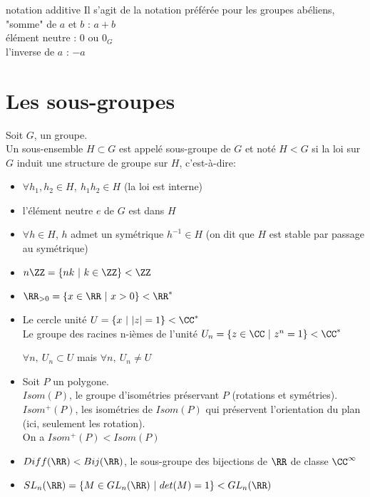 \documentclass[../main.tex]{subfile}
\begin{document}
\begin{ex}
\begin{nota}{notation additive}
	Il s'agit de la notation préférée pour les groupes abéliens, \\
	"somme" de $a$ et $b$ : $a+b$\\
	élément neutre : $0$ ou $0_G$\\
	l'inverse de $a$ : $-a$
\end{nota}

\section{Les sous-groupes}
\begin{defi}
	Soit $G$, un groupe.\\
	Un sous-ensemble $H \subset G$ est appelé sous-groupe de $G$ et noté $H < G$ si la loi sur $G$ induit une structure de groupe sur $H$, c'est-à-dire:\\
\begin{itemize}	
	\item $\forall h_1, h_2 \in H, \ h_1h_2 \in H$ (la loi est interne)
	\item l'élément neutre $e$ de $G$ est dans $H$
	\item $\forall h \in H$, $h$ admet un symétrique $h^{-1} \in H$ (on dit que $H$ est stable par passage au symétrique)
\end{itemize}
\end{defi}

\begin{ex}
\begin{itemize}	
	\item $n \ZZ = \{nk \ |\ k \in \ZZ\} < \ZZ$
	\item $\RR_{> 0} = \{x \in \RR \ |\ x > 0\} < \RR^*$
	\item Le cercle unité $U = \{x \ | \ |z| = 1\} < \CC^*$\\
	Le groupe des racines n-ièmes de l'unité $U_n = \{z \in \CC \ | \ z^n = 1\} < \CC^*$
\begin{rema}	
	$\forall n, \ U_n \subset U$ mais $\forall n, \ U_n \neq U$
\end{rema}
	\item Soit $P$ un polygone.\\
	$Isom(P)$, le groupe d'isométries préservant $P$ (rotations et symétries).\\
	$Isom^+(P)$, les isométries de $Isom(P)$ qui préservent l'orientation du plan (ici, seulement les rotation).\\
	On a $Isom^+(P) < Isom(P)$
	\item $Diff(\RR) < Bij(\RR)$, le sous-groupe des bijections de $\RR$ de classe $\CC^\infty$
	\item $SL_n(\RR) = \{M \in GL_n(\RR) \ |\ det(M) = 1\} < GL_n(\RR)$
\end{itemize}
\end{ex}


\end{ex}
\end{document}
